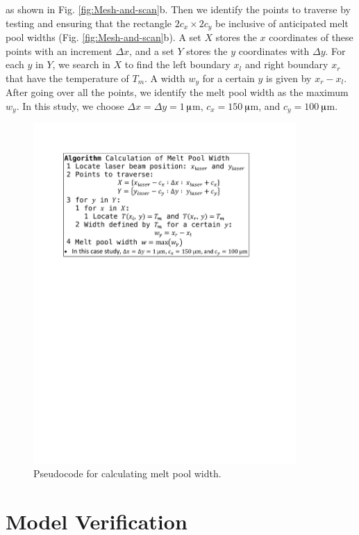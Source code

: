 \documentclass [11pt, proquest] {uwthesis}[2020/02/24]
\begin{document}
as shown in Fig. \ref{fig:Mesh-and-scan}b. Then we identify the points
to traverse by testing and ensuring that the rectangle $2c_{x}\times2c_{y}$
be inclusive of anticipated melt pool widths (Fig. \ref{fig:Mesh-and-scan}b).
A set $X$ stores the $x$ coordinates of these points with an increment
$\Delta x$, and a set $Y$ stores the $y$ coordinates with $\Delta y$.
For each $y$ in $Y$, we search in $X$ to find the left boundary
$x_{l}$ and right boundary $x_{r}$ that have the temperature of
$T_{m}$. A width $w_{y}$ for a certain $y$ is given by $x_{r}-x_{l}$.
After going over all the points, we identify the melt pool width as
the maximum $w_{y}$. In this study, we choose $\Delta x=\Delta y=1\,$$\muup$m,
$c_{x}=150\,$$\muup$m, and $c_{y}=100\,$$\muup$m.
\begin{figure}[!ht]
\begin{centering}
\includegraphics[clip,width=10cm]{Closed-loop-simulation/pseudocode_mpw}
\par\end{centering}
\centering{}\caption{\label{fig:Pseudocode-for-calculating}Pseudocode for calculating
melt pool width.}
\end{figure}

\section{Model Verification} \label{sec:Model-Verification}
\end{document}
